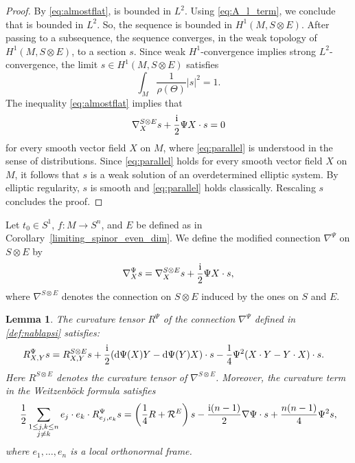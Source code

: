 \documentclass[pdftex]{sigma}
\numberwithin{equation}{section}
\newtheorem{Lemma}[Theorem]{Lemma}
\newcommand{\id}{\mathrm{id}}
\begin{document}
\begin{proof}
By \eqref{eq:almostflat},  is bounded in $L^2$. Using \eqref{eq:A_l_term}, we conclude that \smash{$\nabla^{S \otimes E} \big(\big(\id \otimes \sigma^{(\ell)}\big) s^{(\ell)}\big)$} is bounded in $L^2$. So, the sequence \smash{$\big(\id \otimes \sigma^{(\ell)}\big) s^{(\ell)} \in C^\infty(M,S \otimes E)$} is bounded in $H^1(M,S \otimes E)$.
After passing to a subsequence, the sequence \smash{$\big(\id \otimes \sigma^{(\ell)}\big) s^{(\ell)} \in C^\infty(M,S \otimes E)$} converges, in the weak topology of $H^1(M,S \otimes E)$, to a section $s$.
Since weak $H^1$-convergence implies strong $L^2$-convergence, the limit $s \in H^1(M,S \otimes E)$ satisfies
\[
\int_M \frac{1}{\rho(\Theta)} |s|^2 = 1.
\]
The inequality \eqref{eq:almostflat} implies that
\begin{equation}
\nabla_X^{S \otimes E} s + \frac{\rm i}{2} \Psi X \cdot s = 0
\label{eq:parallel}
\end{equation}
for every smooth vector field $X$ on $M$, where \eqref{eq:parallel} is understood in the sense of distributions.
Since \eqref{eq:parallel} holds for every smooth vector field $X$ on $M$, it follows
that $s$ is a weak solution of an overdetermined elliptic system.
By elliptic regularity, $s$ is smooth and \eqref{eq:parallel} holds classically.
Rescaling $s$ concludes the proof.
\end{proof}

\begin{Definition}
Let $t_0 \in S^1$, $f\colon M \to S^n$, and $E$ be defined as in Corollary~\ref{limiting_spinor_even_dim}.
We define the modified connection $\nabla^\Psi$ on $S \otimes E $ by
\begin{equation}
\nabla_X^\Psi s = \nabla_X^{S \otimes E} s + \frac{\rm i}{2} \Psi X \cdot s,
\label{def:nablapsi}
\end{equation}
where $\nabla^{S \otimes E}$ denotes the connection on $S \otimes E$ induced by the ones on $S$ and $E$.
\end{Definition}

\begin{Lemma}
The curvature tensor $R^\Psi$ of the connection $\nabla^\Psi$ defined in \eqref{def:nablapsi} satisfies:
\begin{align}
R^\Psi_{X,Y}s
&=
R^{S\otimes E}_{X,Y}s + \frac{\rm i}{2} ({\rm d}\Psi(X)Y-{\rm d}\Psi(Y)X) \cdot s - \frac{1}{4} \Psi^2 (X\cdot Y-Y\cdot X)\cdot s .
\label{eq:RPsi}
\end{align}
Here $R^{S\otimes E}$ denotes the curvature tensor of $\nabla^{S\otimes E}$.
Moreover, the curvature term in the Weitzen\-b\"ock formula satisfies
\begin{align}
\frac{1}{2} \sum_{\substack{1\leq j,k\leq n\\ j \neq k}} e_j\cdot e_k\cdot R^\Psi_{e_j,e_k}s
=
\left(\frac{1}{4} R + \mathcal{R}^E\right)s - \frac{{\rm i}(n-1)}{2} \nabla\Psi\cdot s + \frac{n(n-1)}{4} \Psi^2 s,
\label{eq:Weitzenbock}
\end{align}
where $e_1,\dots,e_n$ is a local orthonormal frame.
\end{Lemma}
\end{document}
